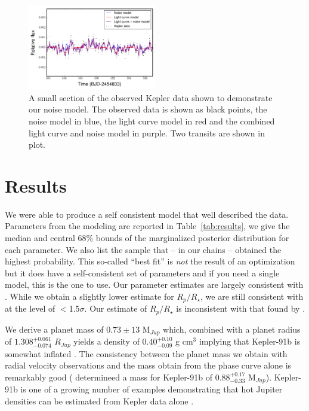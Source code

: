 \documentclass[apjl]{emulateapj}
\begin{document}
\begin{figure}
\includegraphics[width=0.50\textwidth]{noisemodel.png}
\caption{A small section of the observed Kepler data shown to demonstrate our noise model. The observed data is shown as black points, the noise model in blue, the light curve model in red and the combined light curve and noise model in purple. Two transits are shown in plot. }
\label{fig:filter}
\end{figure}


\section{Results}
We were able to produce a self consistent model that well described the data. Parameters from the modeling are reported in Table~\ref{tab:results}, we give the median and central 68\% bounds of the marginalized posterior distribution for each parameter. We also list the sample that -- in our chains -- obtained the highest probability. This so-called ``best fit'' is \emph{not} the result of an optimization but it does have a self-consistent set of parameters and if you need a single model, this is the one to use. Our parameter estimates are largely consistent with \citet{lillo14}. While we obtain a slightly lower estimate for $R_{p}/R_{\star}$, we are still consistent with \citet{lillo14} at the level of $<$1.5$\sigma$. Our estimate of $R_{p}/R_{\star}$ is inconsistent with that found by \citet{sliski14}.

We derive a planet mass of $0.73\pm 13$ M$_{Jup}$ which, combined with a planet radius of $1.308^{+0.061}_{-0.074}$ $R_{Jup}$ yields a density of $0.40^{+0.10}_{-0.09}$ g cm$^{3}$ implying that Kepler-91b is somewhat inflated \citep{baraffe10}. The consistency between the planet mass we obtain with radial velocity observations and the mass \citet{lillo14} obtain from the phase curve alone is remarkably good (\citeauthor{lillo14} determineed a mass for Kepler-91b of $0.88^{+0.17}_{-0.33}$ M$_{Jup}$). Kepler-91b is one of a growing number of examples demonstrating that hot Jupiter densities can be estimated from Kepler data alone \citep[e.g.][]{barclay12,quintana13,esteves13}.
\end{document}
